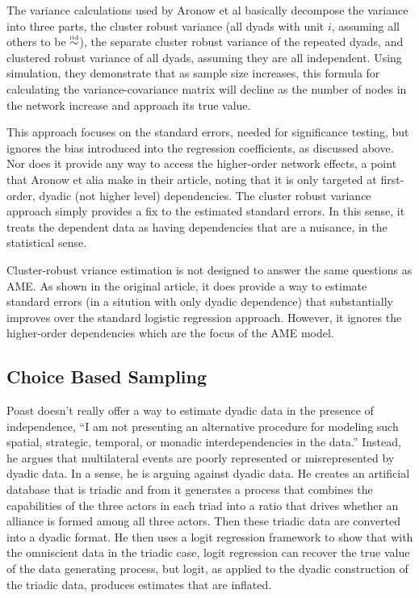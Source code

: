 The variance calculations used by Aronow et al basically decompose the variance into three parts, the cluster robust variance (all dyads with unit $i$, assuming all others to be 
$\simiid$), the separate cluster robust variance of the repeated dyads, and clustered robust variance of all dyads, assuming they are all independent.  Using simulation, they demonstrate that as sample size increases, this formula for calculating the variance-covariance matrix will decline as the number of nodes in the network increase and approach its true value.  

This approach focuses on the standard errors, needed for significance testing, but ignores the bias introduced into the regression coefficients, as discussed above.  Nor does it provide any way to access the higher-order network effects, a point that Aronow et alia make in their article, noting that it is only targeted at first-order, dyadic (not higher level) dependencies. The cluster robust variance approach simply provides a fix to the estimated standard errors.  In this sense, it treats the dependent data as having dependencies that are a nuisance, in the statistical sense.

Cluster-robust vriance estimation is not designed to answer the same questions as AME.  As shown in the original article, it does provide a way to  estimate standard errors (in a sitution with only dyadic dependence) that substantially improves over the standard logistic regression approach.  However, it ignores the higher-order dependencies which are the focus of the AME model.  




\subsection*{Choice Based Sampling}

Poast \citeyear{poast:2010,poast:2016} doesn't really offer a way to estimate dyadic data in the presence of independence,
``I am not presenting an alternative procedure for modeling such spatial, strategic, temporal,
or monadic interdependencies in the data.'' Instead, he argues that multilateral events are poorly represented or misrepresented by dyadic data.  In a sense, he is arguing against dyadic data.  He creates an artificial database that is triadic and from it generates a process that combines the capabilities of the three actors in each triad into a ratio that drives whether an alliance is formed among all three actors.  Then these triadic data are converted into a dyadic format. He then uses a logit regression framework to show that with the omniscient data in the triadic case, logit regression can recover the true value of the data generating process, but logit, as applied to the dyadic construction of the triadic data, produces estimates that are inflated. 

